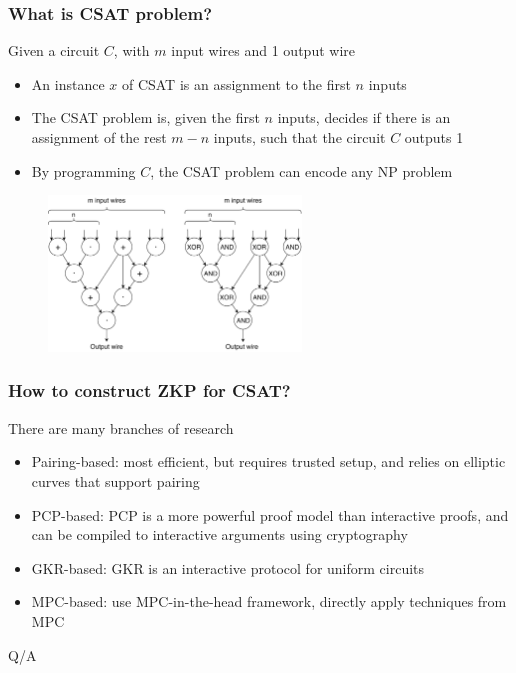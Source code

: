 \documentclass[handout]{beamer} %
\begin{document}
{
  \frametitle{What is CSAT problem?}

  \onslide<+-> Given a circuit $C$, with $m$ input wires and 1 output wire
  \begin{itemize}
    \item<+-> An instance $x$ of CSAT is an assignment to the first $n$ inputs
    \item<+-> The CSAT problem is, given the first $n$ inputs, decides if there is an assignment of the rest $m-n$ inputs, such that the circuit $C$ outputs 1
    \item<+-> By programming $C$, the CSAT problem can encode any NP problem
  \end{itemize}

  \begin{figure}[ht!]
  \includegraphics[width=0.6\textwidth]{images/ZKP-Circuits.pdf}
  \end{figure}
}

{
  \frametitle{How to construct ZKP for CSAT?}

  \onslide<+-> There are many branches of research
  \begin{itemize}
    \item<+-> Pairing-based: most efficient, but requires trusted setup, and relies on elliptic curves that support pairing
    \item<+-> PCP-based: PCP is a more powerful proof model than interactive proofs, and can be compiled to interactive arguments using cryptography
    \item<+-> GKR-based: GKR is an interactive protocol for uniform circuits
    \item<+-> MPC-based: use MPC-in-the-head framework, directly apply techniques from MPC
  \end{itemize}
}

\frame
{
  \center\huge Q/A
}
\end{document}
